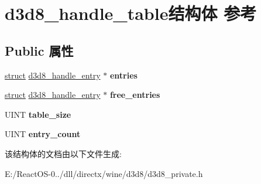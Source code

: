 \hypertarget{structd3d8__handle__table}{}\section{d3d8\+\_\+handle\+\_\+table结构体 参考}
\label{structd3d8__handle__table}
\subsection*{Public 属性}
\begin{DoxyCompactItemize}
\item 
\mbox{\label{structd3d8__handle__table_acf91d8ebbc3ad85bac9c3fdb1dc39f65}} 
\hyperlink{interfacestruct}{struct} \hyperlink{structd3d8__handle__entry}{d3d8\+\_\+handle\+\_\+entry} $\ast$ {\bfseries entries}
\item 
\mbox{\label{structd3d8__handle__table_a89c7e24aa21b9d3b31c3bb3efe150940}} 
\hyperlink{interfacestruct}{struct} \hyperlink{structd3d8__handle__entry}{d3d8\+\_\+handle\+\_\+entry} $\ast$ {\bfseries free\+\_\+entries}
\item 
\mbox{\label{structd3d8__handle__table_aa57bc399c1bc2d56fa7a773c60c2558e}} 
U\+I\+NT {\bfseries table\+\_\+size}
\item 
\mbox{\label{structd3d8__handle__table_af3443bc7a7c6d177f9bf2f32599c9493}} 
U\+I\+NT {\bfseries entry\+\_\+count}
\end{DoxyCompactItemize}


该结构体的文档由以下文件生成\+:\begin{DoxyCompactItemize}
\item 
E\+:/\+React\+O\+S-\/0../dll/directx/wine/d3d8/d3d8\+\_\+private.\+h\end{DoxyCompactItemize}
